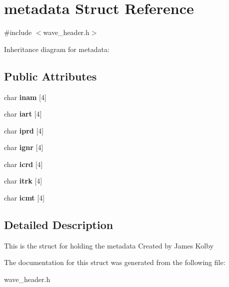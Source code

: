 \hypertarget{structmetadata}{}\section{metadata Struct Reference}
\label{structmetadata}


{\ttfamily \#include $<$wave\+\_\+header.\+h$>$}



Inheritance diagram for metadata\+:
\subsection*{Public Attributes}
\begin{DoxyCompactItemize}
\item 
\mbox{\label{structmetadata_a8b958e4f44d215b42ecad421aa39d4b1}} 
char {\bfseries inam} \mbox{[}4\mbox{]}
\item 
\mbox{\label{structmetadata_af62a0e8a7876bacd1ce4144dad3b1fbc}} 
char {\bfseries iart} \mbox{[}4\mbox{]}
\item 
\mbox{\label{structmetadata_a5b8385781dcc228b031caa83bd64b16c}} 
char {\bfseries iprd} \mbox{[}4\mbox{]}
\item 
\mbox{\label{structmetadata_a48cf62592bce41dc185c57c5c9bf49f1}} 
char {\bfseries ignr} \mbox{[}4\mbox{]}
\item 
\mbox{\label{structmetadata_aab79b70609c9556d07216e61210e212b}} 
char {\bfseries icrd} \mbox{[}4\mbox{]}
\item 
\mbox{\label{structmetadata_afe076e1f2fdf4639d6f081d5e7a56cd4}} 
char {\bfseries itrk} \mbox{[}4\mbox{]}
\item 
\mbox{\label{structmetadata_a916eb165b13118170484df80a27ee324}} 
char {\bfseries icmt} \mbox{[}4\mbox{]}
\end{DoxyCompactItemize}


\subsection{Detailed Description}
This is the struct for holding the metadata Created by James Kolby 

The documentation for this struct was generated from the following file\+:\begin{DoxyCompactItemize}
\item 
wave\+\_\+header.\+h\end{DoxyCompactItemize}
